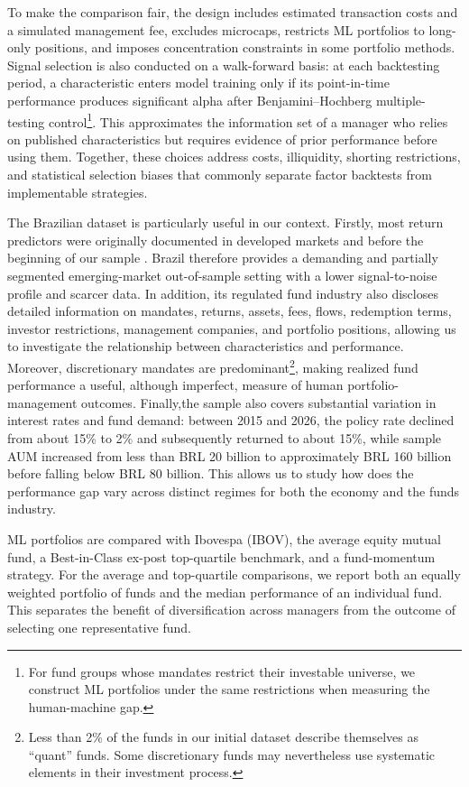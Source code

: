 \documentclass[preprint,12pt,authoryear]{elsarticle}
\begin{document}
To make the comparison fair, the design includes estimated transaction costs and a simulated management fee, excludes microcaps, restricts ML portfolios to long-only positions, and imposes concentration constraints in some portfolio methods. Signal selection is also conducted on a walk-forward basis: at each backtesting period, a characteristic enters model training only if its point-in-time performance produces significant alpha after Benjamini--Hochberg multiple-testing control\footnote{For fund groups whose mandates restrict their investable universe, we construct ML portfolios under the same restrictions when measuring the human-machine gap.}. This approximates the information set of a manager who relies on published characteristics but requires evidence of prior performance before using them. Together, these choices address costs, illiquidity, shorting restrictions, and statistical selection biases that commonly separate factor backtests from implementable strategies.

The Brazilian dataset is particularly useful in our context. Firstly, most return predictors were originally documented in developed markets and before the beginning of our sample \citep{karolyi2016}. Brazil therefore provides a demanding and partially segmented emerging-market out-of-sample setting with a lower signal-to-noise profile and scarcer data. In addition, its regulated fund industry also discloses detailed information on mandates, returns, assets, fees, flows, redemption terms, investor restrictions, management companies, and portfolio positions, allowing us to investigate the relationship between characteristics and performance. Moreover, discretionary mandates are predominant\footnote{Less than 2\% of the funds in our initial dataset describe themselves as ``quant'' funds. Some discretionary funds may nevertheless use systematic elements in their investment process.}, making realized fund performance a useful, although imperfect, measure of human portfolio-management outcomes. Finally,the sample also covers substantial variation in interest rates and fund demand: between 2015 and 2026, the policy rate declined from about 15\% to 2\% and subsequently returned to about 15\%, while sample AUM increased from less than BRL 20 billion to approximately BRL 160 billion before falling below BRL 80 billion.  This allows us to study how
does the performance gap vary across distinct regimes for both the economy
and the funds industry.

ML portfolios are compared with Ibovespa (IBOV), the average equity mutual fund, a Best-in-Class ex-post top-quartile benchmark, and a fund-momentum strategy. For the average and top-quartile comparisons, we report both an equally weighted portfolio of funds and the median performance of an individual fund. This separates the benefit of diversification across managers from the outcome of selecting one representative fund.
\end{document}
